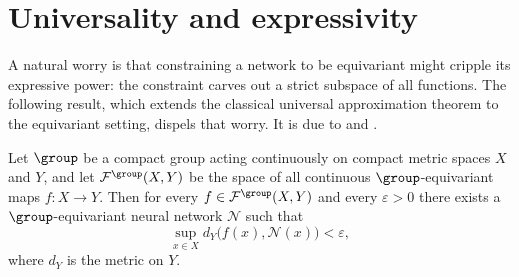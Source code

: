 \section{Universality and expressivity}
\label{sec:priors:universality}

A natural worry is that constraining a network to be equivariant might cripple
its expressive power: the constraint carves out a strict subspace of all
functions. The following result, which extends the classical universal
approximation theorem to the equivariant setting, dispels that worry. It is due
to \citet{yarotsky2022} and \citet{kondor2018generalizationconvolutionalneural}.

\begin{theorem}
\label{thm:priors:universal}
Let $\group$ be a compact group acting continuously on compact metric spaces $X$
and $Y$, and let $\mathcal{F}^{\group}(X, Y)$ be the space of all continuous
$\group$-equivariant maps $f \colon X \to Y$. Then for every
$f \in \mathcal{F}^{\group}(X, Y)$ and every $\varepsilon > 0$ there exists a
$\group$-equivariant neural network $\mathcal{N}$ such that
\[
  \sup_{x \in X} d_Y\bigl(f(x), \mathcal{N}(x)\bigr) < \varepsilon,
\]
where $d_Y$ is the metric on $Y$.
\end{theorem}

